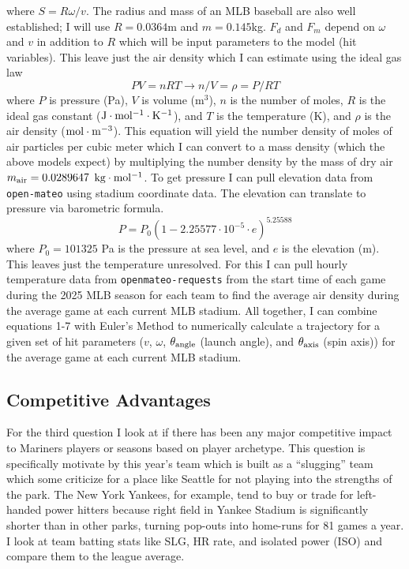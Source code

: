 \documentclass[11pt,twocolumn]{article}
\begin{document}
where $S = R \omega/ v$. The radius and mass of an MLB baseball are also well established; I will use $R = 0.0364$m and $m = 0.145$kg. $F_d$ and $F_m$ depend on $\omega$ and $v$ in addition to $R$ which will be input parameters to the model (hit variables). This leave just the air density which I can estimate using the ideal gas law
\begin{equation}
    PV = nRT \rightarrow n/V = \rho = P/RT 
\end{equation}
where $P$ is pressure (Pa), $V$ is volume (m$^3$), $n$ is the number of moles, $R$ is the ideal gas constant ($\rm J\cdot mol^{-1}\cdot K^{-1}$), and $T$ is the temperature (K), and $\rho$ is the air density ($\rm mol\cdot m^{-3}$). This equation will yield the number density of moles of air particles per cubic meter which I can convert to a mass density (which the above models expect) by multiplying the number density by the mass of dry air $m_{\rm air} = 0.0289647$ $\rm kg \cdot mol^{-1}$. To get pressure I can pull elevation data from \texttt{open-mateo} using stadium coordinate data. The elevation can translate to pressure via barometric formula.
\begin{equation}
    P = P_0 (1 - 2.25577 \cdot 10^{-5} \cdot e)^{5.25588}
\end{equation}
where $P_0 = 101325$ Pa is the pressure at sea level, and $e$ is the elevation (m). This leaves just the temperature unresolved. For this I can pull hourly temperature data from \texttt{openmateo-requests} from the start time of each game during the 2025 MLB season for each team to find the average air density during the average game at each current MLB stadium. All together, I can combine equations 1-7 with Euler's Method to numerically calculate a trajectory for a given set of hit parameters ($v$, $\omega$, $\theta_{\rm angle}$ (launch angle), and $\theta_{\rm axis}$ (spin axis)) for the average game at each current MLB stadium.

\subsection{Competitive Advantages}

For the third question I look at if there has been any major competitive impact to Mariners players or seasons based on player archetype. This question is specifically motivate by this year's team which is built as a ``slugging'' team which some criticize for a place like Seattle for not playing into the strengths of the park. The New York Yankees, for example, tend to buy or trade for left-handed power hitters because right field in Yankee Stadium is significantly shorter than in other parks, turning pop-outs into home-runs for 81 games a year. I look at team batting stats like SLG, HR rate, and isolated power (ISO) and compare them to the league average.
\end{document}
